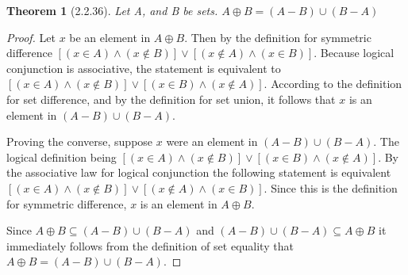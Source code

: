 \documentclass[a4paper, 12pt]{article}
\theoremstyle{plain}
\newtheorem*{theorem*}{Theorem}
\begin{document}
	
	\begin{theorem*}[2.2.36]
		Let A, and B be sets. $A \oplus B = (A - B) \cup (B - A)$
	\end{theorem*}
	
	\begin{proof}
		Let $x$ be an element in $A \oplus B$. Then by the definition for symmetric 
		\newline difference $[(x \in A) \land (x \notin B)] \lor [(x \notin A) \land (x \in B)]$. 
		Because logical \newline conjunction is associative, the statement is equivalent to 
		\newline $[(x \in A) \land (x \notin B)] \lor [(x \in B) \land (x \notin A)]$. According 
		to the definition for set difference, and by the definition for set union, it follows 
		that $x$ is an element in $(A - B) \cup (B - A)$.
		
		Proving the converse, suppose $x$ were an element in $(A - B) \cup (B - A)$. The logical 
		definition being $[(x \in A) \land (x \notin B)] \lor [(x \in B) \land (x \notin A)]$. 
		By the associative law for logical conjunction the following statement is equivalent 
		$[(x \in A) \land (x \notin B)] \lor [(x \notin A) \land (x \in B)]$. Since this is the 
		definition for symmetric difference, $x$ is an element in $A \oplus B$.
		
		Since $A \oplus B \subseteq (A - B) \cup (B - A)$ and 
		$(A - B) \cup (B - A) \subseteq A \oplus B$ it immediately follows from the definition of 
		set equality that \newline $A \oplus B = (A - B) \cup (B - A)$.
	\end{proof}
\end{document}
